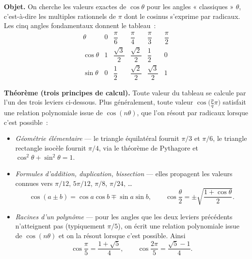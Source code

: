 


\begin{tcolorbox}[thmbox]
  \textbf{Objet.}\enspace{}
  On cherche les valeurs exactes de $\cos\theta$ pour les angles « classiques »
  $\theta$, c'est-à-dire les multiples rationnels de $\pi$ dont le cosinus
  s'exprime par radicaux. Les cinq angles fondamentaux donnent le tableau~:
  \[
    \renewcommand{\arraystretch}{1.6}
    \begin{array}{c|ccccc}
      \theta & 0 & \dfrac{\pi}{6} & \dfrac{\pi}{4} & \dfrac{\pi}{3} & \dfrac{\pi}{2}\\[2pt]
      \hline
      \cos\theta & 1 & \dfrac{\sqrt 3}{2} & \dfrac{\sqrt 2}{2} & \dfrac{1}{2} & 0\\[6pt]
      \sin\theta & 0 & \dfrac{1}{2} & \dfrac{\sqrt 2}{2} & \dfrac{\sqrt 3}{2} & 1
    \end{array}
  \]

  \medskip
  \textbf{Théorème (trois principes de calcul).}
  Toute valeur du tableau se calcule par l'un des trois leviers ci-dessous.
  Plus généralement, toute valeur $\cos\!\big(\tfrac{p}{q}\pi\big)$ satisfait
  une relation polynomiale issue de $\cos(n\theta)$, que l'on résout par
  radicaux lorsque c'est possible~:
  \begin{itemize}
    \item \textit{Géométrie élémentaire} — le triangle équilatéral fournit
      $\pi/3$ et $\pi/6$, le triangle rectangle isocèle fournit $\pi/4$,
      via le théorème de Pythagore et $\cos^2\theta+\sin^2\theta=1$.
    \item \textit{Formules d'addition, duplication, bissection} — elles
      propagent les valeurs connues vers $\pi/12$, $5\pi/12$, $\pi/8$, $\pi/{24}$, \dots
      \[
        \cos(a\pm b)=\cos a\cos b\mp\sin a\sin b,\qquad
        \cos\frac{\theta}{2}=\pm\sqrt{\frac{1+\cos\theta}{2}}.
      \]
    \item \textit{Racines d'un polynôme} — pour les angles que les deux leviers
      précédents n'atteignent pas (typiquement $\pi/5$), on écrit une relation
      polynomiale issue de $\cos(n\theta)$ et on la résout lorsque c'est possible.
      Ainsi
      \[
        \cos\frac{\pi}{5}=\frac{1+\sqrt 5}{4},\qquad
        \cos\frac{2\pi}{5}=\frac{\sqrt 5-1}{4}.
      \]
  \end{itemize}
\end{tcolorbox}

